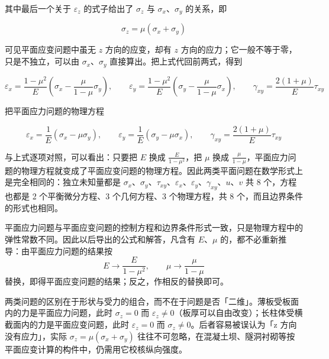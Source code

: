 其中最后一个关于 $\varepsilon_z$ 的式子给出了 $\sigma_z$ 与 $\sigma_x$、$\sigma_y$ 的关系，即

\[
	\sigma_z=\mu\left(\sigma_x+\sigma_y\right)
\]

可见平面应变问题中虽无 $z$ 方向的应变，却有 $z$ 方向的应力；它一般不等于零，只是不独立，可以由 $\sigma_x$、$\sigma_y$ 直接算出。把上式代回前两式，得到

\[
	\varepsilon_x=\frac{1-\mu^{2}}{E}\left(\sigma_x-\frac{\mu}{1-\mu}\sigma_y\right), \qquad
	\varepsilon_y=\frac{1-\mu^{2}}{E}\left(\sigma_y-\frac{\mu}{1-\mu}\sigma_x\right), \qquad
	\gamma_{xy}=\frac{2(1+\mu)}{E}\tau_{xy}
\]

把平面应力问题的物理方程

\[
	\varepsilon_x=\frac{1}{E}\left(\sigma_x-\mu\sigma_y\right), \qquad
	\varepsilon_y=\frac{1}{E}\left(\sigma_y-\mu\sigma_x\right), \qquad
	\gamma_{xy}=\frac{2(1+\mu)}{E}\tau_{xy}
\]

与上式逐项对照，可以看出：只要把 $E$ 换成 $\frac{E}{1-\mu^{2}}$，把 $\mu$ 换成 $\frac{\mu}{1-\mu}$，平面应力问题的物理方程就变成了平面应变问题的物理方程。因此两类平面问题在数学形式上是完全相同的：独立未知量都是 $\sigma_x$、$\sigma_y$、$\tau_{xy}$、$\varepsilon_x$、$\varepsilon_y$、$\gamma_{xy}$、$u$、$v$ 共 8 个，方程也都是 2 个平衡微分方程、3 个几何方程、3 个物理方程，共 8 个，而且边界条件的形式也相同。

\begin{keybox}[小结]
	平面应力问题与平面应变问题的控制方程和边界条件形式一致，只是物理方程中的弹性常数不同。因此以后导出的公式和解答，凡含有 $E$、$\mu$ 的，都不必重新推导：由平面应力问题的结果按
	\[
		E\rightarrow\frac{E}{1-\mu^{2}}, \qquad \mu\rightarrow\frac{\mu}{1-\mu}
	\]
	替换，即得平面应变问题的结果；反之，作相反的替换即可。
\end{keybox}

\begin{note}
	两类问题的区别在于形状与受力的组合，而不在于问题是否「二维」。薄板受板面内的力是平面应力问题，此时 $\sigma_z=0$ 而 $\varepsilon_z\neq0$（板厚可以自由改变）；长柱体受横截面内的力是平面应变问题，此时 $\varepsilon_z=0$ 而 $\sigma_z\neq0$。后者容易被误认为「z 方向没有应力」，实际 $\sigma_z=\mu(\sigma_x+\sigma_y)$ 往往不可忽略，在混凝土坝、隧洞衬砌等按平面应变计算的构件中，仍需用它校核纵向强度。
\end{note}

